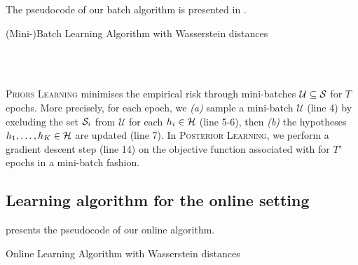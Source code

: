 \begin{noaddcontents}
    The pseudocode of our batch algorithm is presented in .
    
    \begin{algorithm}[H]
    \caption{(Mini-)Batch Learning Algorithm with Wasserstein distances}\label{alg:batch}
    \begin{algorithmic}[1]
    \\
    \EndProcedure
    \newline
    \\
    \EndProcedure
    \end{algorithmic}
    \end{algorithm}
    
    \textsc{Priors Learning} minimises the empirical risk through mini-batches $\mathcal{U}\subseteq\S$ for $T$ epochs. More precisely, for each epoch, we {\it (a)} sample a mini-batch $\mathcal{U}$ (line 4) by excluding the set $\S_i$ from $\mathcal{U}$ for each $h_i\in\H$ (line 5-6), then {\it (b)} the hypotheses $h_1,\dots,h_K\in\H$ are updated (line 7).
    In \textsc{Posterior Learning}, we perform a gradient descent step (line 14) on the objective function associated with  for $T'$ epochs in a mini-batch fashion.
    
    \subsection{Learning algorithm for the online setting}
    \label{sec:alg-online}
    
     presents the pseudocode of our online algorithm.
    
    \begin{algorithm}[H]
    \caption{Online Learning Algorithm with Wasserstein distances}\label{alg:online}
    \begin{algorithmic}[1]
    \\
    \end{algorithmic}
    \end{algorithm}
    

\end{noaddcontents}
